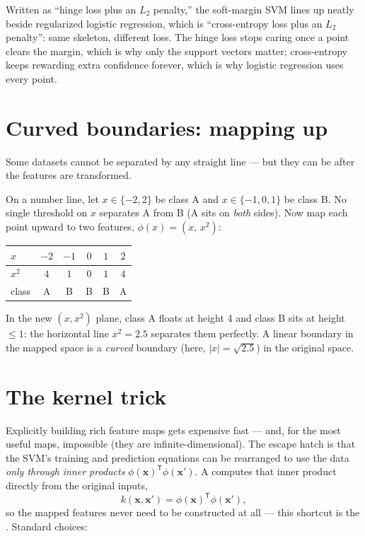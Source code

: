 Written as ``hinge loss plus an $L_2$ penalty,'' the soft-margin SVM lines up neatly beside regularized logistic regression, which is ``cross-entropy loss plus an $L_2$ penalty'': same skeleton, different loss. The hinge loss stops caring once a point clears the margin, which is why only the support vectors matter; cross-entropy keeps rewarding extra confidence forever, which is why logistic regression uses every point.

\section{Curved boundaries: mapping up}

Some datasets cannot be separated by any straight line --- but they can be after the features are transformed.

\begin{workedexample}
On a number line, let $x\in\{-2,2\}$ be class A and $x\in\{-1,0,1\}$ be class B. No single threshold on $x$ separates A from B (A sits on \emph{both} sides). Now map each point upward to two features, $\phi(x)=(x,\,x^2)$:
\begin{mltable}
\begin{tabular}{@{}lccccc@{}}
\toprule
\rowcolor{MLPaleBlue!92}
$x$ & $-2$ & $-1$ & $0$ & $1$ & $2$ \\
\midrule
$x^2$ & $4$ & $1$ & $0$ & $1$ & $4$ \\
class & A & B & B & B & A \\
\bottomrule
\end{tabular}
\end{mltable}
In the new $(x,x^2)$ plane, class A floats at height 4 and class B sits at height $\leq 1$: the horizontal line $x^2=2.5$ separates them perfectly. A linear boundary in the mapped space is a \emph{curved} boundary (here, $|x|=\sqrt{2.5}$) in the original space.
\end{workedexample}

\section{The kernel trick}

Explicitly building rich feature maps gets expensive fast --- and, for the most useful maps, impossible (they are infinite-dimensional). The escape hatch is that the SVM's training and prediction equations can be rearranged to use the data \emph{only through inner products} $\phi(\bm{x})^{\mathsf T}\phi(\bm{x}')$. A  computes that inner product directly from the original inputs,
\[
  k(\bm{x},\bm{x}')=\phi(\bm{x})^{\mathsf T}\phi(\bm{x}'),
\]
so the mapped features never need to be constructed at all --- this shortcut is the . Standard choices:

